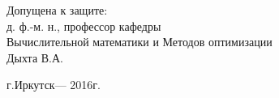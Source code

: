 \begin{titlepage}
\begin{singlespacing}
\begin{flushright}
      Допущена к защите:\\
      д. ф.-м. н., профессор кафедры\\ Вычислительной математики и Методов оптимизации \\ 
      \underline{\phantom{Четкая подпись}} Дыхта В.А. 


    \end{flushright}
    
    \vspace{\fill}
    
    \begin{center}
      г.Иркутск--- 2016г.
    \end{center}
    
  \end{singlespacing}
\end{titlepage}

